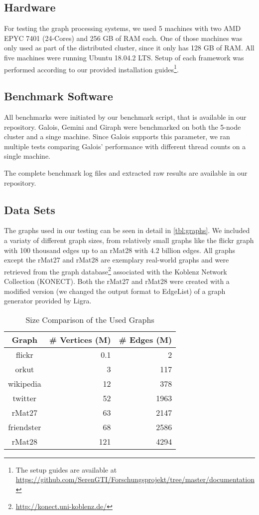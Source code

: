 
\subsection{Hardware}
For testing the graph processing systems, we used 5 machines with two AMD EPYC 7401 (24-Cores) and 256 GB of RAM each. One of those machines was only used as part of the distributed cluster, since it only has 128 GB of RAM.
All five machines were running Ubuntu 18.04.2 LTS.
Setup of each framework was performed according to our provided installation guides\footnote{The setup guides are available at \url{https://github.com/SerenGTI/Forschungsprojekt/tree/master/documentation}}.

\subsection{Benchmark Software}
All benchmarks were initiated by our benchmark script, that is available in our repository. Galois, Gemini and Giraph were benchmarked on both the 5-node cluster and a singe machine.
Since Galois supports this parameter, we ran multiple tests comparing Galois' performance with different thread counts on a single machine.

The complete benchmark log files and extracted raw results are available in our repository.

\subsection{Data Sets}
The graphs used in our testing can be seen in detail in \autoref{tbl:graphs}. We included a variaty of different graph sizes, from relatively small graphs like the flickr graph with 100 thousand edges up to an rMat28 with $4.2$ billion edges. All graphs except the rMat27 and rMat28 are exemplary real-world graphs and were retrieved from the graph database\footnote{\url{http://konect.uni-koblenz.de/}} associated with the Koblenz Network Collection (KONECT)\cite{konect}.
Both the rMat27 and rMat28 were created with a modified version (we changed the output format to EdgeList) of a graph generator provided by Ligra.
\begin{table}
	\centering
	\caption{Size Comparison of the Used Graphs}
	\begin{tabular}{crr}
		\hline
		\bf{Graph}&\# Vertices (M)&\# Edges (M)\\\hline
		flickr&    		0.1&  2\\
		orkut&          3&    117\\
		wikipedia&      12&   378\\
		twitter&     	52&   1963\\
		rMat27&         63&   2147\\
		friendster&     68&   2586\\
		rMat28&         121&  4294\\
		\hline
	\end{tabular}
	\label{tbl:graphs}
\end{table}


